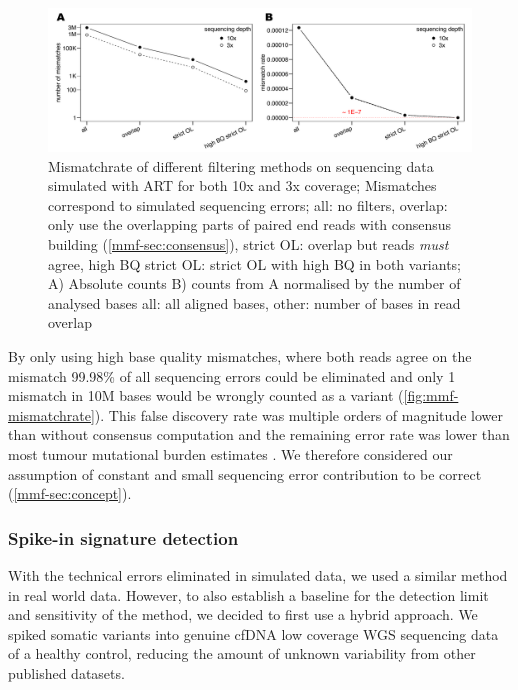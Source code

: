 \begin{figure}[ht]
\centering
\includegraphics[width=.99\linewidth]{Figures/MisMatchFinder/mismatchrateCleanSequencing.pdf}
\caption[Mismatchrate of different filtering methods]{Mismatchrate of different filtering methods on sequencing data simulated with ART\cite{Huang2011} for both 10x and 3x coverage; Mismatches correspond to simulated sequencing errors; all: no filters, overlap: only use the overlapping parts of paired end reads with consensus building (\protect\autoref{mmf-sec:consensus}), strict OL: overlap but reads \emph{must} agree, high BQ strict OL: strict OL with high BQ in both variants; A) Absolute counts B) counts from A normalised by the number of analysed bases all: all aligned bases, other: number of bases in read overlap}\label{fig:mmf-mismatchrate}
\end{figure}

By only using high base quality mismatches, where both reads agree on the mismatch 99.98\% of all sequencing errors could be eliminated and only 1 mismatch in 10M bases would be wrongly counted as a variant (\autoref{fig:mmf-mismatchrate}). This false discovery rate was multiple orders of magnitude lower than without consensus computation and the remaining error rate was lower than most tumour mutational burden estimates \cite{Alexandrov2020,Lawrence2013a}. We therefore considered our assumption of constant and small sequencing error contribution to be correct (\autoref{mmf-sec:concept}).


\subsubsection{Spike-in signature detection}
\label{mmf-sec:simSignatures}
With the technical errors eliminated in simulated data, we used a similar method in real world data. However, to also establish a baseline for the detection limit and sensitivity of the method, we decided to first use a hybrid approach. We spiked somatic variants into genuine cfDNA low coverage WGS sequencing data of a healthy control, reducing the amount of unknown variability from other published datasets.

